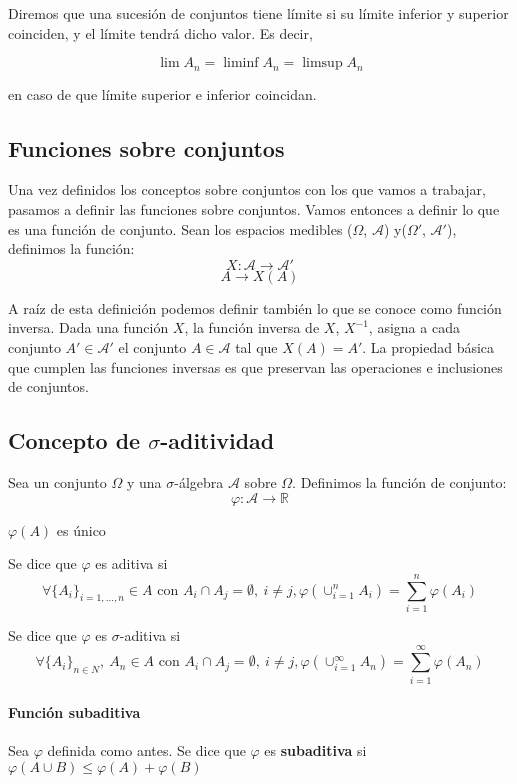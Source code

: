 Diremos que una sucesión de conjuntos tiene límite si su límite inferior y superior coinciden, y el límite tendrá dicho  valor. Es decir,

$$ \lim A_n = \liminf A_n = \limsup A_n $$

en caso de que límite superior e inferior coincidan.

\subsection{Funciones sobre conjuntos}

Una vez definidos los conceptos sobre conjuntos con los que vamos a trabajar, pasamos a definir las funciones sobre conjuntos. Vamos entonces a definir lo que es una función de conjunto. Sean los espacios medibles ($\Omega$, $\mathcal{A}$) y($\Omega'$, $\mathcal{A}'$), definimos la función:
$$ X: \mathcal{A} \to \mathcal{A}'$$
$$ A \longrightarrow X(A)$$

A raíz de esta definición podemos definir también lo que se conoce como función inversa. Dada una función $X$, la función inversa de $X$, $X^{-1}$, asigna a cada conjunto $A' \in \mathcal{A}'$ el conjunto $A \in \mathcal{A}$ tal que $X(A) = A'$. La propiedad básica que cumplen las funciones inversas es que preservan las operaciones e inclusiones de conjuntos.

\subsection{Concepto de $\sigma$-aditividad}
Sea un conjunto $\Omega$ y una $\sigma$-álgebra $\mathcal{A}$ sobre $\Omega$. Definimos la función de conjunto:
$$\varphi : \mathcal{A} \rightarrow \mathbb{R}$$
\begin{center}
$\varphi (A)$ es único\\
\end{center}
Se dice que $\varphi$ es aditiva si
\[
\forall \{A_i\}_{i=1,...,n} \in A \text{ con } A_i \cap A_j = \emptyset, \ i \ne j , \varphi( \cup_{i=1}^n A_i ) = \sum_{i=1}^n \varphi(A_i)
\]

Se dice que $\varphi$ es $\sigma$-aditiva si
\[
\forall \{A_i\}_{n\in N}, \ A_n \in A \text{ con } A_i \cap A_j = \emptyset, \ i \ne j , \varphi( \cup_{i=1}^\infty A_n ) = \sum_{i=1}^\infty \varphi(A_n)
\]

\paragraph{Función subaditiva}
Sea $\varphi$ definida como antes. Se dice que $\varphi$ es \textbf{subaditiva} si $\varphi(A \cup B) \leq \varphi(A) + \varphi(B)$

